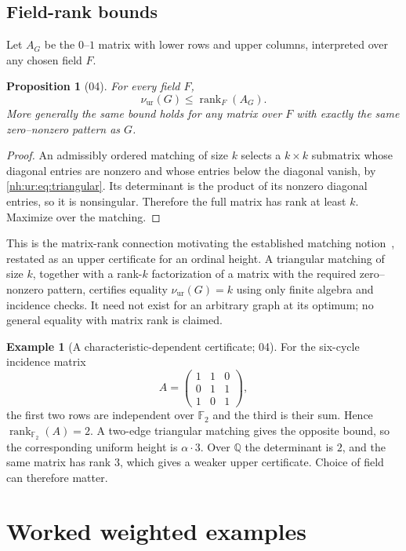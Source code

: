 \documentclass[11pt,a4paper]{article}
\newtheorem{proposition}[theorem]{Proposition}
\theoremstyle{definition}
\newtheorem{example}[theorem]{Example}
\theoremstyle{remark}
\newcommand{\nuur}{\nu_{\mathrm{ur}}}
\begin{document}
\subsection{Field-rank bounds}
Let $A_G$ be the $0$--$1$ matrix with lower rows and upper columns,
interpreted over any chosen field $F$.
\begin{proposition}[04]\label{nh:ur:prop:rank}
For every field $F$,
\[
 \nuur(G)\le\operatorname{rank}_F(A_G).
\]
More generally the same bound holds for any matrix over $F$ with exactly the
same zero--nonzero pattern as $G$.
\end{proposition}
\begin{proof}
An admissibly ordered matching of size $k$ selects a $k\times k$ submatrix
whose diagonal entries are nonzero and whose entries below the diagonal
vanish, by \eqref{nh:ur:eq:triangular}. Its determinant is the product of its
nonzero diagonal entries, so it is nonsingular. Therefore the full matrix has
rank at least $k$. Maximize over the matching.
\end{proof}
This is the matrix-rank connection motivating the established matching
notion~\cite{GHL2001}, restated as an upper certificate for an ordinal
height. A triangular matching of size $k$, together with a rank-$k$
factorization of a matrix with the required zero--nonzero pattern, certifies
equality $\nuur(G)=k$ using only finite algebra and incidence checks. It need
not exist for an arbitrary graph at its optimum; no general equality with
matrix rank is claimed.

\begin{example}[A characteristic-dependent certificate; 04]\label{nh:ur:ex:cycle}
For the six-cycle incidence matrix
\[
 A=\begin{pmatrix}1&1&0\\0&1&1\\1&0&1\end{pmatrix},
\]
the first two rows are independent over $\mathbb F_2$ and the third is their
sum. Hence $\operatorname{rank}_{\mathbb F_2}(A)=2$. A two-edge triangular
matching gives the opposite bound, so the corresponding uniform height is
$\alpha\cdot3$. Over $\mathbb Q$ the determinant is $2$, and the same matrix
has rank $3$, which gives a weaker upper certificate. Choice of field can
therefore matter.
\end{example}

\section{Worked weighted examples}\label{nh:ur:sec:examples}
\setcounter{equation}{0}
\end{document}
